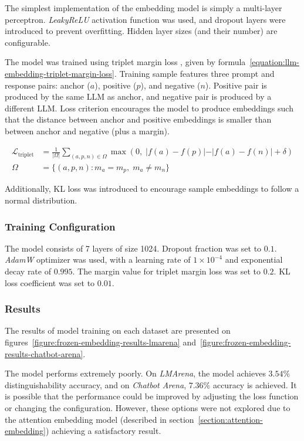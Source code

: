 \documentclass[a4paper,11pt,twoside]{report}
\theoremstyle{definition}
\begin{document}
The simplest implementation of the embedding model is simply a multi-layer perceptron. \textit{LeakyReLU} activation function was used, and dropout layers were introduced to prevent overfitting. Hidden layer sizes (and their number) are configurable.

The model was trained using triplet margin loss \cite{schroff2015facenet}, given by formula~\ref{equation:llm-embedding-triplet-margin-loss}. Training sample features three prompt and response pairs: anchor ($a$), positive ($p$), and negative ($n$). Positive pair is produced by the same LLM as anchor, and negative pair is produced by a different LLM. Loss criterion encourages the model to produce embeddings such that the distance between anchor and positive embeddings is smaller than between anchor and negative (plus a margin).

\begin{align}
\label{equation:llm-embedding-triplet-margin-loss}
    \mathcal{L}_{\mathrm{triplet}} &= \frac{1}{|\Omega|} \sum_{(a,p,n) \in \Omega} \max\!\left(0,\; \vert f(a) - f(p) \vert - \vert f(a) - f(n) \vert + \delta\right) \\
    \Omega &= \{(a, p, n) : m_a = m_p,\; m_a \neq m_n\}
\end{align}

Additionally, KL loss \cite{kingma2014vae} was introduced to encourage sample embeddings to follow a normal distribution.

\subsubsection{Training Configuration}

The model consists of 7 layers of size 1024. Dropout fraction was set to $0.1$. \textit{AdamW} optimizer was used, with a learning rate of $1 \times 10^{-4}$ and exponential decay rate of $0.995$. The margin value for triplet margin loss was set to $0.2$. KL loss coefficient was set to $0.01$.

\subsubsection{Results}

The results of model training on each dataset are presented on figures~\ref{figure:frozen-embedding-results-lmarena} and~\ref{figure:frozen-embedding-results-chatbot-arena}. 

The model performs extremely poorly. On \textit{LMArena}, the model achieves $3.54 \%$ distinguishability accuracy, and on \textit{Chatbot Arena}, $7.36 \%$ accuracy is achieved. It is possible that the performance could be improved by adjusting the loss function or changing the configuration. However, these options were not explored due to the attention embedding model (described in section~\ref{section:attention-embedding}) achieving a satisfactory result.
\end{document}
